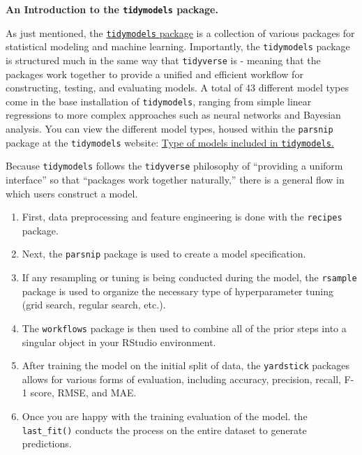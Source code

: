 \documentclass[
  letterpaper,
]{krantz}
\providecommand{\tightlist}{%
  \setlength{\itemsep}{0pt}\setlength{\parskip}{0pt}}\usepackage{longtable,booktabs,array}
\begin{document}
\begin{tcolorbox}[enhanced jigsaw, left=2mm, toprule=.15mm, opacitybacktitle=0.6, leftrule=.75mm, bottomrule=.15mm, colbacktitle=quarto-callout-important-color!10!white, breakable, colback=white, bottomtitle=1mm, toptitle=1mm, title=\textcolor{quarto-callout-important-color}{\faExclamation}\hspace{0.5em}{Important}, coltitle=black, titlerule=0mm, arc=.35mm, opacityback=0, colframe=quarto-callout-important-color-frame, rightrule=.15mm]

\textbf{An Introduction to the \texttt{tidymodels} package.}

As just mentioned, the
\href{https://www.tidymodels.org/}{\texttt{tidymodels} package} is a
collection of various packages for statistical modeling and machine
learning. Importantly, the \texttt{tidymodels} package is structured
much in the same way that \texttt{tidyverse} is - meaning that the
packages work together to provide a unified and efficient workflow for
constructing, testing, and evaluating models. A total of 43 different
model types come in the base installation of \texttt{tidymodels},
ranging from simple linear regressions to more complex approaches such
as neural networks and Bayesian analysis. You can view the different
model types, housed within the \texttt{parsnip} package at the
\texttt{tidymodels} website:
\href{https://www.tidymodels.org/find/parsnip/}{Type of models included
in \texttt{tidymodels}.}

Because \texttt{tidymodels} follows the \texttt{tidyverse} philosophy of
``providing a uniform interface'' so that ``packages work together
naturally,'' there is a general flow in which users construct a model.

\begin{enumerate}
\def\labelenumi{\arabic{enumi}.}
\tightlist
\item
  First, data preprocessing and feature engineering is done with the
  \texttt{recipes} package.
\item
  Next, the \texttt{parsnip} package is used to create a model
  specification.
\item
  If any resampling or tuning is being conducted during the model, the
  \texttt{rsample} package is used to organize the necessary type of
  hyperparameter tuning (grid search, regular search, etc.).
\item
  The \texttt{workflows} package is then used to combine all of the
  prior steps into a singular object in your RStudio environment.
\item
  After training the model on the initial split of data, the
  \texttt{yardstick} packages allows for various forms of evaluation,
  including accuracy, precision, recall, F-1 score, RMSE, and MAE.
\item
  Once you are happy with the training evaluation of the model. the
  \texttt{last\_fit()} conducts the process on the entire dataset to
  generate predictions.
\end{enumerate}


\end{tcolorbox}
\end{document}
